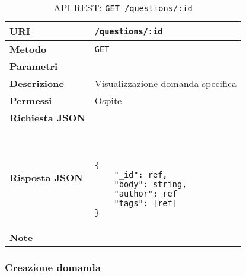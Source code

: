         \begin{table}[H]
            \begin{center}
                \begin{tabular}{p{} p{}}
                    \toprule
                    \textbf{URI} & \texttt{/questions/:id} \\ \midrule
                    \textbf{Metodo} & \texttt{GET} \\ \midrule
                    \textbf{Parametri} & \\ \midrule
                    \textbf{Descrizione} & Visualizzazione domanda specifica \\ \midrule
                    \textbf{Permessi} & Ospite \\ \midrule
                    \textbf{Richiesta JSON} & \\ \midrule
                    \textbf{Risposta JSON} & \
                        \begin{lstlisting}[basicstyle={\ttfamily}]
{
    "_id": ref,
    "body": string,
    "author": ref
    "tags": [ref]
}
                        \end{lstlisting}
                        \\ \midrule
                    \textbf{Note} & \\
                    \bottomrule
                \end{tabular}
                \caption{API REST: \texttt{GET /questions/:id}}
            \end{center}
        \end{table}

    \subsubsection{Creazione domanda}

